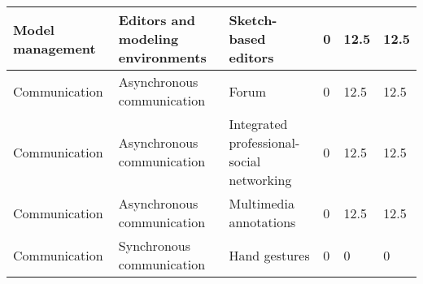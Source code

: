 \begin{table*}[]
\begin{tabular}{|l|l|l|l|l|l|}
Model management & Editors and modeling environments & Sketch-based editors & 0 & 12.5 & 12.5 \\ \hline 
Communication & Asynchronous communication & Forum & 0 & 12.5 & 12.5 \\ \hline 
Communication & Asynchronous communication & Integrated professional-social networking & 0 & 12.5 & 12.5 \\ \hline 
Communication & Asynchronous communication & Multimedia annotations & 0 & 12.5 & 12.5 \\ \hline 
Communication & Synchronous communication & Hand gestures & 0 & 0 & 0 \\ \hline 
\end{tabular}%
  \end{table*}